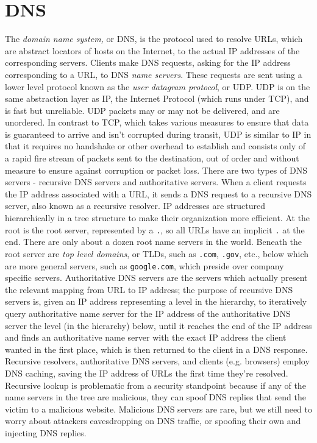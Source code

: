 \documentclass{article}
\begin{document}
\section{DNS}
The \textit{domain name system,} or DNS, is the protocol used to resolve URLs, which are abstract locators of hosts on the Internet, to the actual IP addresses of the corresponding servers. Clients make DNS requests, asking for the IP address corresponding to a URL, to DNS \textit{name servers}. These requests are sent using a lower level protocol known as the \textit{user datagram protocol}, or UDP. UDP is on the same abstraction layer as IP, the Internet Protocol (which runs under TCP), and is fast but unreliable. UDP packets may or may not be delivered, and are unordered. In contrast to TCP, which takes various measures to ensure that data is guaranteed to arrive and isn't corrupted during transit, UDP is similar to IP in that it requires no handshake or other overhead to establish and consists only of a rapid fire stream of packets sent to the destination, out of order and without measure to ensure against corruption or packet loss.
\newline \newline
There are two types of DNS servers - recursive DNS servers and authoritative servers. When a client requests the IP address associated with a URL, it sends a DNS request to a recursive DNS server, also known as a recursive resolver. IP addresses are structured hierarchically in a tree structure to make their organization more efficient. At the root is the root server, represented by a \texttt{.}, so all URLs have an implicit \texttt{.} at the end. There are only about a dozen root name servers in the world. Beneath the root server are \textit{top level domains}, or TLDs, such as \texttt{.com}, \texttt{.gov}, etc., below which are more general servers, such as \texttt{google.com}, which preside over company specific servers. Authoritative DNS servers are the servers which actually present the relevant mapping from URL to IP address; the purpose of recursive DNS servers is, given an IP address representing a level in the hierarchy, to iteratively query authoritative name server for the IP address of the authoritative DNS server the level (in the hierarchy) below, until it reaches the end of the IP address and finds an authoritative name server with the exact IP address the client wanted in the first place, which is then returned to the client in a DNS response.
\newline
Recursive resolvers, authoritative DNS servers, and clients (e.g. browsers) employ DNS caching, saving the IP address of URLs the first time they're resolved. Recursive lookup is problematic from a security standpoint because if any of the name servers in the tree are malicious, they can spoof DNS replies that send the victim to a malicious website. Malicious DNS servers are rare, but we still need to worry about attackers eavesdropping on DNS traffic, or spoofing their own and injecting DNS replies.
\end{document}
